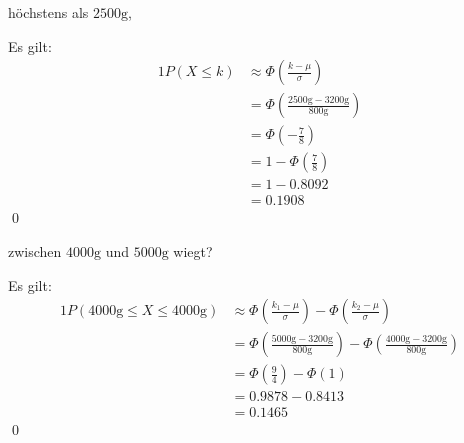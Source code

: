 \documentclass{abgabe}
\begin{document}
\begin{questions}
\begin{parts}
\begin{subparts}
            \subpart
            höchstens als $2500\si{\g}$,
            \begin{solution}
                Es gilt:
                \begin{alignat*}{1}
                    P(X \leq k) & \approx \Phi \left( \frac{k-\mu}{\sigma} \right)                                                  \\
                                & =                                  \Phi \left( \frac{2500\si{\g}-3200\si{\g}}{800\si{\g}} \right) \\
                                & =                                  \Phi \left( - \frac{7}{8} \right)                              \\
                                & =                                  1 - \Phi \left( \frac{7}{8} \right)                            \\
                                & =                                  1 - 0.8092                                                     \\
                                & =                                  0.1908
                \end{alignat*}
                \qed
            \end{solution}

            \newpage
            \subpart
            zwischen $4000\si{\g}$ und $5000\si{\g}$ wiegt?
            \begin{solution}
                Es gilt:
                \begin{alignat*}{1}
                    P(4000\si{\g} \leq X \leq 4000\si{\g}) & \approx \Phi \left( \frac{k_1-\mu}{\sigma} \right) -  \Phi \left( \frac{k_2-\mu}{\sigma} \right)                                   \\
                                                           & = \Phi \left( \frac{5000\si{\g}-3200\si{\g}}{800\si{\g}} \right) -  \Phi \left( \frac{4000\si{\g}-3200\si{\g}}{800\si{\g}} \right) \\
                                                           & = \Phi \left( \frac{9}{4} \right) -  \Phi \left( 1 \right)                                                                         \\
                                                           & = 0.9878 -  0.8413                                                                                                                 \\
                                                           & = 0.1465
                \end{alignat*}
                \qed
            \end{solution}
        \end{subparts}


\end{parts}
\end{questions}
\end{document}
